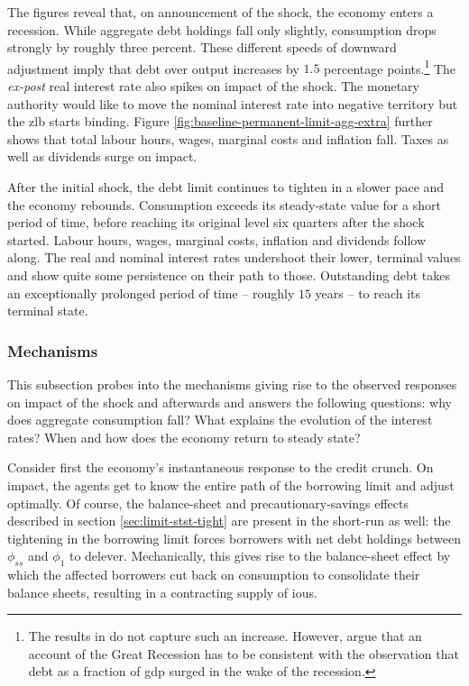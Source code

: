 \documentclass[12pt]{article} %
\numberwithin{equation}{section} %
\numberwithin{figure}{section}
\numberwithin{table}{section}
\begin{document}
The figures reveal that, on announcement of the shock, the economy enters a recession. While aggregate debt holdings fall only slightly, consumption drops strongly by roughly three percent. These different speeds of downward adjustment imply that debt over output increases by $1.5$ percentage points.\footnote{The results in \textcite{gl2017} do not capture such an increase. However, \textcite{justiniano2015} argue that an account of the Great Recession has to be consistent with the observation that debt as a fraction of \Gls{gdp} surged in the wake of the recession.} The \textit{ex-post} real interest rate also spikes on impact of the shock. The monetary authority would like to move the nominal interest rate into negative territory but the \Gls{zlb} starts binding. Figure \ref{fig:baseline-permanent-limit-agg-extra} further shows that total labour hours, wages, marginal costs and inflation fall. Taxes as well as dividends surge on impact.

After the initial shock, the debt limit continues to tighten in a slower pace and the economy rebounds. Consumption exceeds its steady-state value for a short period of time, before reaching its original level six quarters after the shock started. Labour hours, wages, marginal costs, inflation and dividends follow along. The real and nominal interest rates undershoot their lower, terminal values and show quite some persistence on their path to those. Outstanding debt takes an exceptionally prolonged period of time -- roughly $15$ years -- to reach its terminal state. 

\subsubsection{Mechanisms}
\label{sec:limit-transition-mechanisms}

This subsection probes into the mechanisms giving rise to the observed responses on impact of the shock and afterwards and answers the following questions: why does aggregate consumption fall? What explains the evolution of the interest rates? When and how does the economy return to steady state?

Consider first the economy's instantaneous response to the credit crunch. On impact, the agents get to know the entire path of the borrowing limit and adjust optimally. Of course, the balance-sheet and precautionary-savings effects described in section \ref{sec:limit-stst-tight} are present in the short-run as well: the tightening in the borrowing limit forces borrowers with net debt holdings between $\phi_{ss}$ and $\phi_1$ to delever. Mechanically, this gives rise to the balance-sheet effect by which the affected borrowers cut back on consumption to consolidate their balance sheets, resulting in a contracting supply of \Gls{iou}s. 
\end{document}
